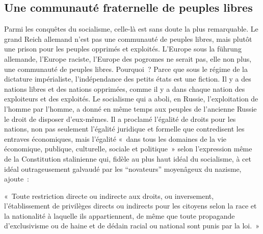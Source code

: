 \documentclass[french,twoside]{book} %
\newenvironment{quoteblock}%
  {\begin{quoting}}
  {\end{quoting}}
\newenvironment{quotebar}{%
    \def\FrameCommand{{\color{rubric!10!}\vrule width 0.5em} \hspace{0.9em}}%
    \def\OuterFrameSep{\itemsep} %
    \MakeFramed {\advance\hsize-\width \FrameRestore}
  }%
  {%
    \endMakeFramed
  }
\renewenvironment{quoteblock}%
  {%
    \savenotes
    \setstretch{0.9}
    \normalfont
    \begin{quotebar}
  }
  {%
    \end{quotebar}
    \spewnotes
  }
\begin{document}
\subsection[Une communauté fraternelle de peuples libres]{Une communauté fraternelle de peuples libres}
\noindent Parmi les conquêtes du socialisme, celle-là est sans doute la plus remarquable. Le grand Reich allemand n’est pas une communauté de peuples libres, mais plutôt une prison pour les peuples opprimés et exploités. L’Europe sous la führung allemande, l’Europe raciste, l’Europe des pogromes ne serait pas, elle non plus, une communauté de peuples libres. Pourquoi ? Parce que sous le régime de la dictature impérialiste, l’indépendance des petits états est une fiction. Il y a des nations libres et des nations opprimées, comme il y a dans chaque nation des exploiteurs et des exploités. Le socialisme qui a aboli, en Russie, l’exploitation de l’homme par l’homme, a donné en même temps aux peuples de l’ancienne Russie le droit de disposer d’eux-mêmes. Il a proclamé l’égalité de droits pour les nations, non pas seulement l’égalité juridique et formelle que contredisent les entraves économiques, mais l’égalité « dans tous les domaines de la vie économique, publique, culturelle, sociale et politique » selon l’expression même de la Constitution stalinienne qui, fidèle au plus haut idéal du socialisme, à cet idéal outrageusement galvaudé par les “novateurs” moyenâgeux du nazisme, ajoute :\par

\begin{quoteblock}
 \noindent « Toute restriction directe ou indirecte aux droits, ou inversement, l’établissement de privilèges directs ou indirects pour les citoyens selon la race et la nationalité à laquelle ils appartiennent, de même que toute propagande d’exclusivisme ou de haine et de dédain racial ou national sont punis par la loi. »
 \end{quoteblock}
\end{document}
